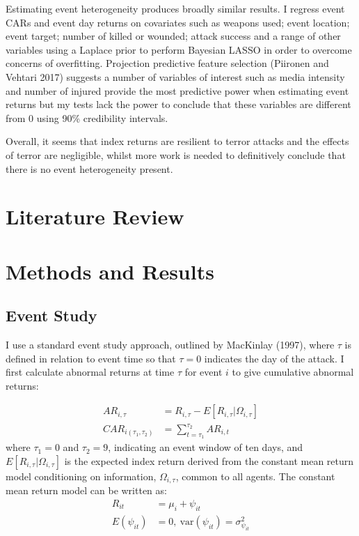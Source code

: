\documentclass[]{AEA}
\begin{document}
Estimating event heterogeneity produces broadly similar results. I
regress event CARs and event day returns on covariates such as weapons
used; event location; event target; number of killed or wounded; attack
success and a range of other variables using a Laplace prior to perform
Bayesian LASSO in order to overcome concerns of overfitting. Projection
predictive feature selection (Piironen and Vehtari 2017) suggests a
number of variables of interest such as media intensity and number of
injured provide the most predictive power when estimating event returns
but my tests lack the power to conclude that these variables are
different from 0 using 90\% credibility intervals.

Overall, it seems that index returns are resilient to terror attacks and
the effects of terror are negligible, whilst more work is needed to
definitively conclude that there is no event heterogeneity present.

\section{Literature Review}

\section{Methods and Results}\subsection{Event Study}

I use a standard event study approach, outlined by MacKinlay (1997),
where \(\tau\) is defined in relation to event time so that \(\tau = 0\)
indicates the day of the attack. I first calculate abnormal returns at
time \(\tau\) for event \(i\) to give cumulative abnormal returns:

\[ \begin{aligned} AR_{i,\tau} &=R_{i,\tau}-E[R_{i,\tau}\vert\Omega_{i,\tau}] \\
CAR_{i(\tau_{1},\tau_{2})} &=\sum_{t=\tau_{1}}^{\tau_{2}} AR_{i,t} \end{aligned}
\] where \(\tau_1 = 0\) and \(\tau_2 = 9\), indicating an event window
of ten days, and \(E[R_{i,\tau}\vert\Omega_{i,\tau}]\) is the expected
index return derived from the constant mean return model conditioning on
information, \(\Omega_{i,\tau}\), common to all agents. The constant
mean return model can be written as:
\[ \begin{aligned} R_{it} &= \mu_i + \psi_{it} \\ E(\psi_{it}) &= 0, \ \text{var}(\psi_{it}) = \sigma_{\psi_{it}}^2 \end{aligned}\]
\end{document}
